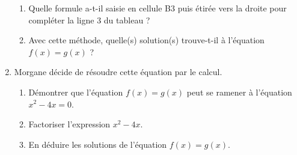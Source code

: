 \begin{act}
\begin{enumerate}
	\begin{enumerate}
		\item Quelle formule a-t-il saisie en cellule B3 puis étirée vers la droite pour compléter la ligne 3 du tableau ?
		\item Avec cette méthode, quelle(s) solution(s) trouve-t-il à l'équation $f(x) = g(x)$ ?
	\end{enumerate}
\item Morgane décide de résoudre cette équation par le calcul.
	\begin{enumerate}
		\item Démontrer que l'équation $f(x) = g(x)$ peut se ramener à l'équation $x^2 - 4x = 0$. 
		\item Factoriser l'expression $x^2 - 4x$.
		\item En déduire les solutions de l'équation $f(x) = g(x)$.
	\end{enumerate}
\end{enumerate}
\end{act}


